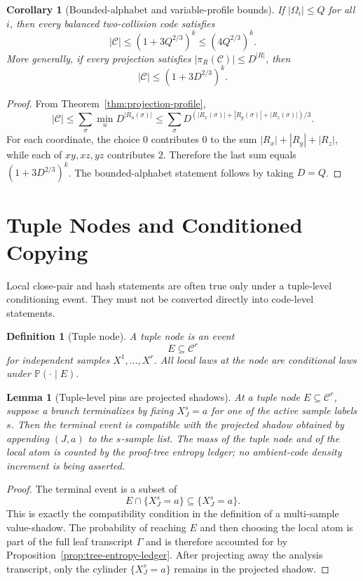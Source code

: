 \documentclass[11pt]{article}
\newtheorem{lemma}[theorem]{Lemma}
\newtheorem{corollary}[theorem]{Corollary}
\newtheorem{definition}[theorem]{Definition}
\newcommand{\C}{\mathcal C}
\newcommand{\Prb}{\mathbb P}
\begin{document}
\begin{corollary}[Bounded-alphabet and variable-profile bounds]
\label{cor:bounded-alphabet}
If $|\Omega_i|\le Q$ for all $i$, then every balanced two-collision code
satisfies
\[
  |\C|\le (1+3Q^{2/3})^k\le (4Q^{2/3})^k.
\]
More generally, if every projection satisfies
$|\pi_R(\C)|\le D^{|R|}$, then
\[
  |\C|\le (1+3D^{2/3})^k.
\]
\end{corollary}

\begin{proof}
From Theorem~\ref{thm:projection-profile},
\[
  |\C|
  \le
  \sum_{\sigma}
  \min_{u}D^{|R_u(\sigma)|}
  \le
  \sum_{\sigma}
  D^{(|R_x(\sigma)|+|R_y(\sigma)|+|R_z(\sigma)|)/3}.
\]
For each coordinate, the choice $0$ contributes $0$ to the sum
$|R_x|+|R_y|+|R_z|$, while each of $xy,xz,yz$ contributes $2$.  Therefore the
last sum equals $(1+3D^{2/3})^k$.  The bounded-alphabet statement follows by
taking $D=Q$.
\end{proof}

\section{Tuple Nodes and Conditioned Copying}

Local close-pair and hash statements are often true only under a tuple-level
conditioning event.  They must not be converted directly into code-level
statements.

\begin{definition}[Tuple node]
A tuple node is an event
\[
  E\subseteq \C^r
\]
for independent samples $X^1,\ldots,X^r$.  All local laws at the node are
conditional laws under $\Prb(\cdot\mid E)$.
\end{definition}

\begin{lemma}[Tuple-level pins are projected shadows]
\label{lem:tuple-pin-shadow}
At a tuple node $E\subseteq\C^r$, suppose a branch terminalizes by fixing
$X^s_J=a$ for one of the active sample labels $s$.  Then the terminal event is
compatible with the projected shadow obtained by appending $(J,a)$ to the
$s$-sample list.  The mass of the tuple node and of the local atom is counted
by the proof-tree entropy ledger; no ambient-code density increment is being
asserted.
\end{lemma}

\begin{proof}
The terminal event is a subset of
\[
  E\cap\{X^s_J=a\}
  \subseteq \{X^s_J=a\}.
\]
This is exactly the compatibility condition in the definition of a
multi-sample value-shadow.  The probability of reaching $E$ and then choosing
the local atom is part of the full leaf transcript $\Gamma$ and is therefore
accounted for by Proposition~\ref{prop:tree-entropy-ledger}.  After projecting
away the analysis transcript, only the cylinder $\{X^s_J=a\}$ remains in the
projected shadow.
\end{proof}
\end{document}
